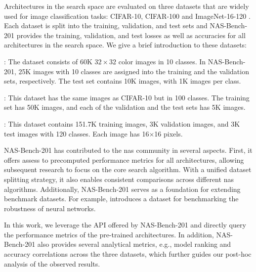 \vspace{0.5em}

Architectures in the search space are evaluated on three datasets that are widely used for image classification tasks: CIFAR-10, CIFAR-100 \cite{krizhevsky2009learning} and ImageNet-16-120 \cite{chrabaszcz2017downsampled}. Each dataset is split into the training, validation, and test sets and NAS-Bench-201 provides the training, validation, and test losses as well as accuracies for all architectures in the search space. We give a brief introduction to these datasets:

\begin{description}[leftmargin=0cm, listparindent=\parindent]
 	\item[CIFAR10]:	The dataset consists of 60K $32\times32$ color images in 10 classes. In NAS-Bench-201, 25K images with 10 classes are assigned into the training and the validation sets, respectively. The test set contains 10K images, with 1K images per class.
 	\item[CIFAR100]: This dataset has the same images as CIFAR-10 but in 100 classes. The training set has 50K images, and each of the validation and the test sets has 5K images.
 	\item[ImageNet-16-120]: This dataset contains 151.7K training images, 3K validation images, and 3K test images with 120 classes. Each image has 16$\times$16 pixels.
\end{description} 


NAS-Bench-201 has contributed to the \gls{nas} community in several aspects. First, it offers assess to precomputed performance metrics for all architectures, allowing subsequent research to focus on the core search algorithm. With a unified dataset splitting strategy, it also enables consistent comparisons across different \gls{nas} algorithms. Additionally, NAS-Bench-201 serves as a foundation for extending benchmark datasets. For example, \cite{jung2023neural} introduces a dataset for benchmarking the robustness of neural networks.

In this work, we leverage the API offered by NAS-Bench-201 and directly query the performance metrics of the pre-trained architectures. In addition, NAS-Bench-201 also provides several analytical metrics, e.g., model ranking and accuracy correlations across the three datasets, which further guides our post-hoc analysis of the observed results.
